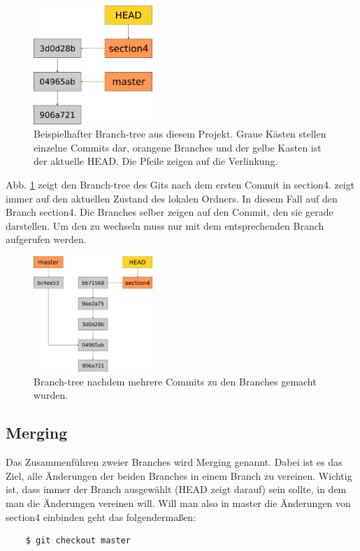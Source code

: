 \begin{figure}[!ht]
	\centering
	\includegraphics[width=0.4\textwidth]{Bilder/branching.png}
	\caption{Beispielhafter Branch-tree aus diesem Projekt. Graue Kästen stellen einzelne Commits dar, orangene Branches und der gelbe Kasten ist der aktuelle HEAD. Die Pfeile zeigen auf die Verlinkung.}
	\label{fig:branch_1}
\end{figure}
Abb. \ref{fig:branch_1} zeigt den Branch-tree des Gits nach dem ersten Commit in section4.  zeigt immer auf den aktuellen Zustand des lokalen Ordners. In diesem Fall auf den Branch section4. Die Branches selber zeigen auf den Commit, den sie gerade darstellen. Um den  zu wechseln muss nur  mit dem entsprechenden Branch aufgerufen werden.
\begin{figure}[!ht]
	\centering
	\includegraphics[width=0.4\textwidth]{Bilder/branching_2.png}
	\caption{Branch-tree nachdem mehrere Commits zu den Branches gemacht wurden.}
	\label{fig:branch_2}
\end{figure}

\subsection{Merging}
Das Zusammenführen zweier Branches wird Merging genannt. Dabei ist es das Ziel, alle Änderungen der beiden Branches in einem Branch zu vereinen. Wichtig ist, dass immer der Branch ausgewählt (HEAD zeigt darauf) sein sollte, in dem man die Änderungen vereinen will. Will man also in master die Änderungen von section4 einbinden geht das folgendermaßen:
\begin{lstlisting}
	$ git checkout master
\end{lstlisting}
